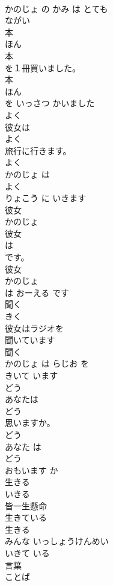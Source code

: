 \documentclass[8pt]{extreport}
\begin{document}
\begin{CJK}{UTF8}{min}
\\	かのじょ の かみ は とても 
\\	ながい
\\	本	
\\	ほん	
\\	本
\\	を１冊買いました。	
\\	本 
\\	ほん
\\	を いっさつ かいました	
\\	よく	
\\	彼女は
\\	よく
\\	旅行に行きます。	
\\	よく 
\\	かのじょ は 
\\	よく
\\	りょこう に いきます	
\\	彼女	
\\	かのじょ	
\\	彼女
\\	は
\\	です。	
\\	彼女 
\\	かのじょ
\\	は おーえる です	
\\	聞く	
\\	きく	
\\	彼女はラジオを
\\	聞いています
\\	聞く 
\\	かのじょ は らじお を 
\\	きいて います
\\	どう	
\\	あなたは
\\	どう
\\	思いますか。	
\\	どう 
\\	あなた は 
\\	どう
\\	おもいます か	
\\	生きる	
\\	いきる	
\\	皆一生懸命
\\	生きている
\\	生きる 
\\	みんな いっしょうけんめい 
\\	いきて いる
\\	言葉	
\\	ことば	

\end{CJK}
\end{document}
